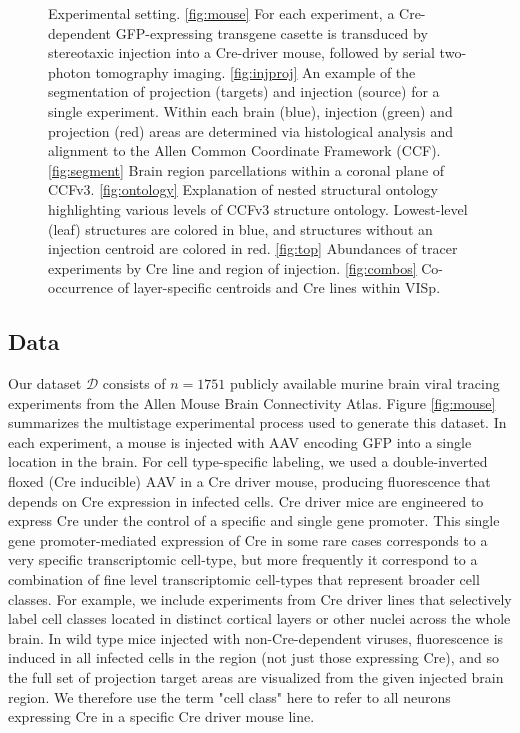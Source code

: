\begin{figure}[H]
    \caption{Experimental setting.  \ref{fig:mouse}  For each experiment, a Cre-dependent GFP-expressing transgene casette is transduced by stereotaxic injection into a Cre-driver mouse, followed by serial two-photon tomography imaging.
    \ref{fig:injproj} An example of the segmentation of projection (targets) and injection (source) for a single experiment. Within each brain (blue), injection (green) and projection (red) areas are determined via histological analysis and alignment to the Allen Common Coordinate Framework (CCF).
    \ref{fig:segment} Brain region parcellations within a coronal plane of CCFv3. \ref{fig:ontology} Explanation of nested structural ontology highlighting various levels of CCFv3 structure ontology. Lowest-level (leaf) structures are colored in blue, and structures without an injection centroid are colored in red.
    \ref{fig:top}  Abundances of tracer experiments by Cre line and region of injection. \ref{fig:combos}  Co-occurrence of layer-specific centroids and Cre lines within VISp.}
    \label{fig:data}
\end{figure}

\newpage

\subsection{Data}

Our dataset $\mathcal D$ consists of $n=1751$ publicly available murine brain viral tracing experiments from the Allen Mouse Brain Connectivity Atlas.
Figure \ref{fig:mouse} summarizes the multistage experimental process used to generate this dataset.
In each experiment, a mouse is injected with AAV encoding GFP into a single location in the brain. For cell type-specific labeling, we used a double-inverted floxed (Cre inducible) AAV in a Cre driver mouse, producing fluorescence that depends on Cre expression in infected cells. Cre driver mice are engineered to express Cre under the control of a specific and single gene promoter.
This single gene promoter-mediated expression of Cre in some rare cases corresponds to a very specific transcriptomic cell-type, but more frequently it correspond to a combination of fine level transcriptomic cell-types that represent broader cell classes.
For example, we include experiments from Cre driver lines that selectively label cell classes located in distinct cortical layers or other nuclei across the whole brain. 
In wild type mice injected with non-Cre-dependent viruses, fluorescence is induced in all infected cells in the region (not just those expressing Cre), and so the full set of projection target areas are visualized from the given injected brain region.
We therefore use the term "cell class" here to refer to all neurons expressing Cre in a specific Cre driver mouse line.

